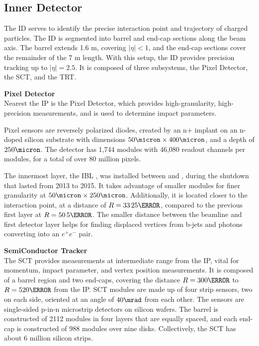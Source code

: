 \subsection{Inner Detector}  \label{ssec:innerdetector}

The \gls{ID} \cite{inner-detector-tdr} serves to identify the precise interaction point and trajectory of charged particles. The \gls{ID} is segmented into barrel and end-cap sections along the beam axis. The barrel extends 1.6 m, covering $|\eta| < 1$, and the end-cap sections cover the remainder of the 7 m length. With this setup, the \gls{ID} provides precision tracking up to $|\eta| = 2.5$. It is composed of three subsystems, the Pixel Detector, the \gls{SCT}, and the \gls{TRT}.

\noindent\textbf{Pixel Detector}\\
\indent Nearest the \gls{IP} is the Pixel Detector, which provides high-granularity, high-precision measurements, and is used to determine impact parameters.

Pixel sensors are reversely polarized diodes, created by an n+ implant on an n-doped silicon substrate with dimensions $ \unit{50}{\micron} \times \unit{400}{\micron}$, and a depth of $\unit{250}{\micron}$. The detector has 1,744 modules with 46,080 readout channels per modules, for a total of over 80 million pixels.
    
The innermost layer, the \gls{IBL} \cite{ibl-tdr}, was installed between \RunOne and \RunTwo, during the shutdown that lasted from 2013 to 2015. It takes advantage of smaller modules for finer granularity at $\unit{50}{\micron} \times \unit{250}{\micron}$. Additionally, it is located closer to the interaction point, at a distance of $R=\unit{33.25}{\mm}$, compared to the previous first layer at $R=\unit{50.5}{\mm}$. The smaller distance between the beamline and first detector layer helps for finding displaced vertices from b-jets and photons converting into an $e^+e^-$ pair.

\noindent\textbf{SemiConductor Tracker}\\
\indent The \gls{SCT} provides measurements at intermediate range from the \gls{IP}, vital for momentum, impact parameter, and vertex position measurements. It is composed of a barrel region and two end-caps, covering the distance $R=\unit{300}{\mm}$ to $R= \unit{520}{\mm}$ from the \gls{IP}. \gls{SCT} modules are made up of four strip sensors, two on each side, oriented at an angle of $\unit{40}{\mrad}$ from each other. The sensors are single-sided p-in-n microstrip detectors on silicon wafers. The barrel is constructed of 2112 modules in four layers that are equally spaced, and each end-cap is constructed of 988 modules over nine disks. Collectively, the \gls{SCT} has about 6 million silicon strips.

